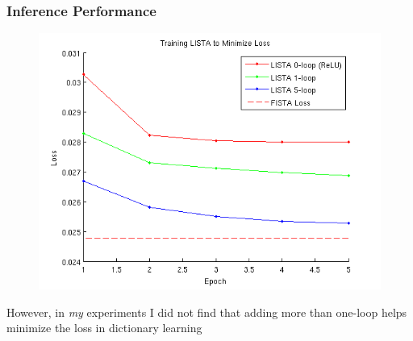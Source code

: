 \documentclass{beamer}
\begin{document}
\begin{frame} 
\frametitle{Inference Performance}  
\begin{figure} 
\includegraphics[scale=0.4]{./figures/LISTA_loss_min.png}
\end{figure} 
\small{However, in \emph{my} experiments I did not find that adding more than one-loop helps minimize the loss in dictionary learning} 
\end{frame} 
\end{document}
